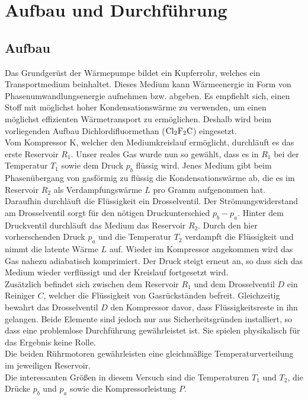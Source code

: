 \section{Aufbau und Durchführung}
\label{sec:Durchführung}
\subsection{Aufbau}

Das Grundgerüst der Wärmepumpe bildet ein Kupferrohr, welches ein Transportmedium beinhaltet.
Dieses Medium kann Wärmeenergie in Form von Phasenumwandlungsenergie aufnehmen bzw. abgeben.
Es empfiehlt sich, einen Stoff mit möglichst hoher Kondensationswärme zu verwenden, um einen möglichst effizienten Wärmetransport zu ermöglichen.
Deshalb wird beim vorliegenden Aufbau Dichlordifluormethan ($\ce{Cl2F2C}$) eingesetzt.\\
Vom Kompressor K, welcher den Mediumkreislauf ermöglicht, durchläuft es das erste Reservoir $R_1$.
Unser reales Gas wurde nun so gewählt, dass es in $R_1$ bei der Temperatur $T_1$ sowie dem Druck $p_b$ flüssig wird.
Jenes Medium gibt beim Phasenübergang von gasförmig zu flüssig die Kondensationswärme ab, die es im Reservoir $R_2$ als Verdampfungswärme $L$ pro Gramm aufgenommen hat.
Daraufhin durchläuft die Flüssigkeit ein Drosselventil.
Der Strömungswiderstand am Drosselventil sorgt für den nötigen Druckunterschied $p_b-p_a$.
Hinter dem Druckventil durchläuft das Medium das Reservoir $R_2$.
Durch den hier vorherschenden Druck $p_a$ und die Temperatur $T_2$ verdampft die Flüssigkeit und nimmt die latente Wärme $L$ auf.
Wieder im Kompressor angekommen wird das Gas nahezu adiabatisch komprimiert.
Der Druck steigt erneut an, so dass sich das Medium wieder verflüssigt und der Kreislauf fortgesetzt wird.\\
Zusätzlich befindet sich zwischen dem Reservoir $R_1$ und dem Drosselventil $D$ ein Reiniger $C$, welcher die Flüssigkeit von Gasrückständen befreit.
Gleichzeitig bewahrt das Drosselventil $D$ den Kompressor davor, dass Flüssigkeitsreste in ihn gelangen.
Beide Elemente sind jedoch nur aus Sicherheitsgründen installiert, so dass eine problemlose Durchführung gewährleistet ist.
Sie spielen physikalisch für das Ergebnis keine Rolle.\\
Die beiden Rührmotoren gewährleisten eine gleichmäßige Temperaturverteilung im jeweiligen Reservoir.\\
Die interessanten Größen in diesem Versuch sind die Temperaturen $T_1$ und $T_2$, die Drücke $p_b$ und $p_a$ sowie die Kompressorleistung $P$.

